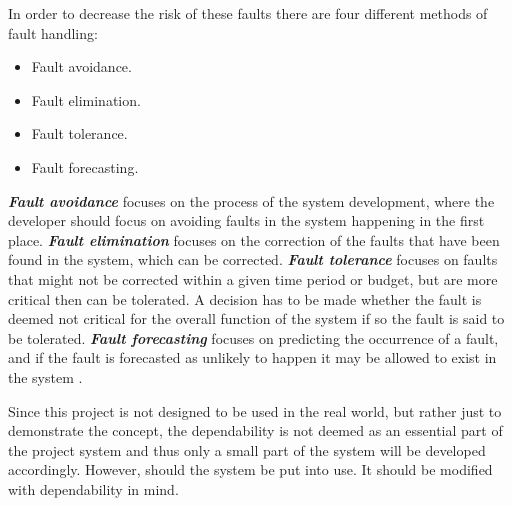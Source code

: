 In order to decrease the risk of these faults there are four different methods of fault handling:
\begin{itemize}
\item Fault avoidance.
\item Fault elimination.
\item Fault tolerance.
\item Fault forecasting.
\end{itemize}
\textit{\textbf{Fault avoidance}} focuses on the process of the system development, where the developer should focus on avoiding faults in the system happening in the first place.
\textit{\textbf{Fault elimination}} focuses on the correction of the faults that have been found in the system, which can be corrected. 
\textit{\textbf{Fault tolerance}} focuses on faults that might not be corrected within a given time period or budget, but are more critical then can be tolerated.
A decision has to be made whether the fault is deemed not critical for the overall function of the system if so the fault is said to be tolerated.
\textit{\textbf{Fault forecasting}} focuses on predicting the occurrence of a fault, and if the fault is forecasted as unlikely to happen it may be allowed to exist in the system \cite{FundementalsOfDependableComputingForSoftwareEngineers}. 

Since this project is not designed to be used in the real world, but rather just to demonstrate the concept, the dependability is not deemed as an essential part of the project system and thus only a small part of the system will be developed accordingly.
However, should the system be put into use.
It should be modified with dependability in mind. 

